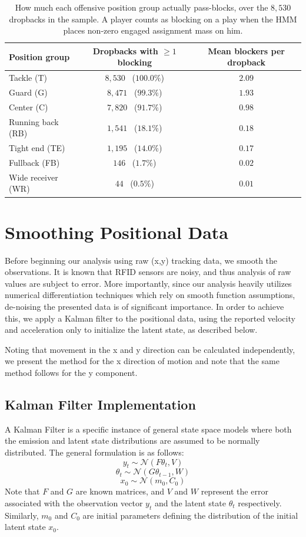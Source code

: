 \documentclass[USenglish]{article}
\let\OldSubsection\subsection
\renewcommand{\subsection}{\FloatBarrier\OldSubsection}
\theoremstyle{dgthm}
\theoremstyle{dgdef}
\begin{document}
\begin{appendices}
\begin{table}[h!]
\centering
\footnotesize
\begin{tabular}{lcc}
\toprule
Position group & Dropbacks with $\geq\!1$ blocking & Mean blockers per dropback \\
\midrule
Tackle (T)        & $8{,}530$ \ ($100.0\%$) & $2.09$ \\
Guard (G)         & $8{,}471$ \ ($99.3\%$)  & $1.93$ \\
Center (C)        & $7{,}820$ \ ($91.7\%$)  & $0.98$ \\
Running back (RB) & $1{,}541$ \ ($18.1\%$)  & $0.18$ \\
Tight end (TE)    & $1{,}195$ \ ($14.0\%$)  & $0.17$ \\
Fullback (FB)     & $146$ \ ($1.7\%$)       & $0.02$ \\
Wide receiver (WR)& $44$ \ ($0.5\%$)        & $0.01$ \\
\bottomrule
\end{tabular}
\caption{How much each offensive position group actually pass-blocks, over the $8{,}530$ dropbacks in the sample. A player counts as blocking on a play when the HMM places non-zero engaged assignment mass on him.}
\label{tab:posgroups}
\end{table}


\section{Smoothing Positional Data}
\label{sec:kalman_filter}
Before beginning our analysis using raw (x,y) tracking data, we smooth the observations. It is known that RFID sensors are noisy, and thus analysis of raw values are subject to error. More importantly, since our analysis heavily utilizes numerical differentiation techniques which rely on smooth function assumptions, de-noising the presented data is of significant importance.  In order to achieve this, we apply a Kalman filter to the positional data, using the reported velocity and acceleration only to initialize the latent state, as described below.

Noting that movement in the x and y direction can be calculated independently, we present the method for the x direction of motion and note that the same method follows for the y component.
\subsection{Kalman Filter Implementation}
A Kalman Filter is a specific instance of general state space models where both the emission and latent state distributions are assumed to be normally distributed. The general formulation is as follows:
$$  y_t \sim \mathcal{N}(F \theta_t, V) $$
$$  \theta_t \sim \mathcal{N}(G \theta_{t-1}, W) $$
$$  x_0 \sim \mathcal{N}(m_0, C_0)$$
Note that $F$ and $G$ are known matrices, and $V$ and $W$ represent the error associated with the observation vector $y_t$ and the latent state $\theta_t$ respectively. Similarly, $m_0$ and $C_0$ are initial parameters defining the distribution of the initial latent state $x_0$. 


\end{appendices}
\end{document}
